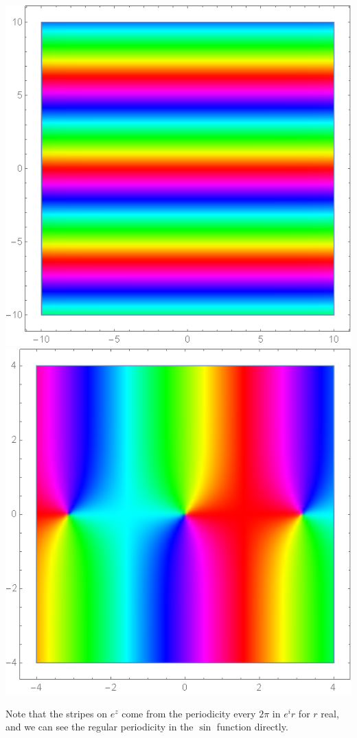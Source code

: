 \begin{center}
    \includegraphics[scale=0.27]{images/colorez.png}
    \includegraphics[scale=0.27]{images/colorsinz.png}
\end{center}
Note that the stripes on $e^z$ come from the periodicity every $2\pi$ in $e^ir$ for $r$ real, and we can see the regular periodicity in the $\sin$ function directly.

